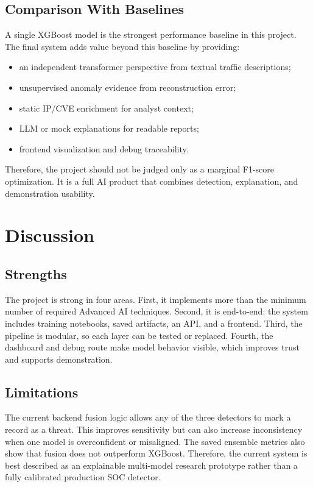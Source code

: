 \documentclass[12pt,a4paper]{article}
\begin{document}
\subsection{Comparison With Baselines}

A single XGBoost model is the strongest performance baseline in this project. The final system adds value beyond this baseline by providing:

\begin{itemize}[leftmargin=1.2cm]
    \item an independent transformer perspective from textual traffic descriptions;
    \item unsupervised anomaly evidence from reconstruction error;
    \item static IP/CVE enrichment for analyst context;
    \item LLM or mock explanations for readable reports;
    \item frontend visualization and debug traceability.
\end{itemize}

Therefore, the project should not be judged only as a marginal F1-score optimization. It is a full AI product that combines detection, explanation, and demonstration usability.

\section{Discussion}
\label{sec:discussion}

\subsection{Strengths}

The project is strong in four areas. First, it implements more than the minimum number of required Advanced AI techniques. Second, it is end-to-end: the system includes training notebooks, saved artifacts, an API, and a frontend. Third, the pipeline is modular, so each layer can be tested or replaced. Fourth, the dashboard and debug route make model behavior visible, which improves trust and supports demonstration.

\subsection{Limitations}

The current backend fusion logic allows any of the three detectors to mark a record as a threat. This improves sensitivity but can also increase inconsistency when one model is overconfident or misaligned. The saved ensemble metrics also show that fusion does not outperform XGBoost. Therefore, the current system is best described as an explainable multi-model research prototype rather than a fully calibrated production SOC detector.
\end{document}
